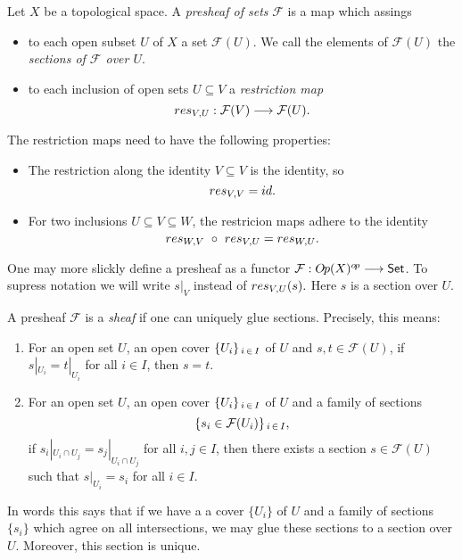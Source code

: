 \begin{definition}[Presheaves] 
  Let $X$ be a topological space. A \textit{presheaf of sets} $\mathcal{F}$  is a map which assings
  \begin{itemize}
    \item to each open subset $U$ of $X$ a set $\mathcal{F}(U)$. We call the elements of $\mathcal{F}(U)$ the \textit{sections of $\mathcal{F}$ over $U$}.
    \item to each inclusion of open sets $U \subseteq V$ a \textit{restriction map}
    \[res_{V\kern-0.1em , U}: \mathcal{F}(V) \longrightarrow\mathcal{F}(U).\]
  \end{itemize}
    The restriction maps need to have the following properties: 
    \begin{itemize}
      \item The restriction along the identity $V \subseteq V$ is the identity, so 
            \[res_{V\kern-0.1em , V} = id.\]
      \item For two inclusions $U \subseteq V \subseteq W$, the restricion maps adhere to the identity 
            \[res_{W\kern-0.1em , V}\ \circ\ res_{V\kern-0.1em , U} = res_{W\kern-0.1em , U}.\]
    \end{itemize}
  One may more slickly define a presheaf as a functor $\mathcal{F}: O\kern-0.10em p(X)^{o\kern-0.10em p}\longrightarrow \mathsf{Set}$. To supress notation we will write $s|_V$ instead of $res_{V\kern-0.1em , U}(s).$ Here $s$ is a section over $U$.\\
\end{definition}
\begin{definition}[Sheaves]
  A presheaf $\mathcal{F}$ is a \textit{sheaf} if one can uniquely glue sections. Precisely, this means:
  \begin{enumerate}
    \item For an open set $U$, an open cover $\{U_i\}_{\, i\, \in \, I}$ of $U$ and $s, t \in \mathcal{F}(U)$, if $s|_{U_i} = t|_{U_i}$ for all $i \in I$, then $s = t$.
    \item For an open set $U$, an open cover $\{U_i\}_{\, i\, \in \, I}$ of $U$ and a family of sections
    \[\{s_i \in \mathcal{F}(U_i)\}_{\, i\, \in \, I},\]
     if $s_i|_{U_i \cap U_j} = s_j|_{U_i \cap U_j}$ for all $i,j \in I$, then there exists a section $s \in \mathcal{F}(U)$ such that $s|_{U_i} = s_i$ for all $i \in I$.
  \end{enumerate}
  In words this says that if we have a a cover $\{U_i\}$ of $U$ and a family of sections $\{s_i\}$ which agree on all intersections, we may glue these sections to a section over $U$. Moreover, this section is unique.
\end{definition}

